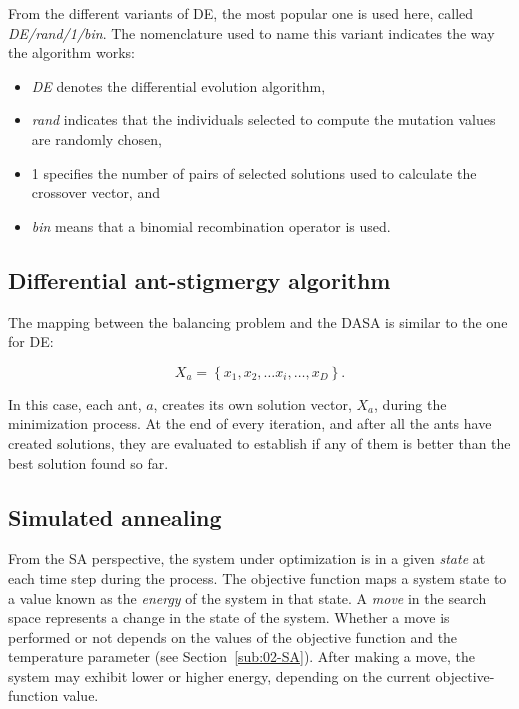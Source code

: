 From the different variants of DE, the most popular one is used here,
called \emph{DE/rand/1/bin}. The nomenclature used to name this variant
indicates the way the algorithm works:
\begin{itemize}
\item \emph{DE }denotes the differential evolution algorithm,
\item \emph{rand }indicates that the individuals selected to compute the
mutation values are randomly chosen,
\item 1\emph{ }specifies the number of pairs of selected solutions used
to calculate the crossover vector, and
\item \emph{bin }means that a binomial recombination operator is used.
\end{itemize}

\subsection{Differential ant-stigmergy algorithm}

The mapping between the balancing problem and the DASA is similar
to the one for DE:

\begin{equation}
X_{a}=\left\{ x_{1},x_{2},\ldots x_{i},\ldots,x_{D}\right\} .\label{eq:07-DASA_mapping}
\end{equation}


\noindent In this case, each ant, $a$, creates its own solution vector,
$X_{a}$, during the minimization process. At the end of every iteration,
and after all the ants have created solutions, they are evaluated
to establish if any of them is better than the best solution found
so far.


\subsection{Simulated annealing}

From the SA perspective, the system under optimization is in a given
\emph{state} at each time step during the process. The objective function
maps a system state to a value known as the \emph{energy} of the system
in that state. A \emph{move} in the search space represents a change
in the state of the system. Whether a move is performed or not depends
on the values of the objective function and the temperature parameter
(see Section\ \ref{sub:02-SA}). After making a move, the system
may exhibit lower or higher energy, depending on the current objective-function
value.

